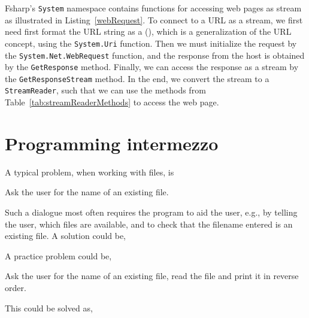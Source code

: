 Fsharp's \lstinline!System! namespace contains functions for accessing web pages as stream as illustrated in Listing~\ref{webRequest}.
%
%
To connect to a URL as a stream, we first need first format the URL string as a  (), which is a generalization of the URL concept, using the \lstinline!System.Uri! function. Then we must initialize the request by the \lstinline!System.Net.WebRequest! function, and the response from the host is obtained by the \lstinline!GetResponse! method. Finally, we can access the response as a stream by the \lstinline!GetResponseStream! method. In the end, we convert the stream to a \lstinline!StreamReader!, such that we can use the methods from Table~\ref{tab:streamReaderMethods} to access the web page.

\section{Programming intermezzo}
A typical problem, when working with files, is
\begin{problem}
  Ask the user for the name of an existing file.
\end{problem}
Such a dialogue most often requires the program to aid the user, e.g., by telling the user, which files are available, and to check that the filename entered is an existing file. A solution could be,
%
%

A practice problem could be,
\begin{problem}
  Ask the user for the name of an existing file, read the file and print it in reverse order.
\end{problem}
This could be solved as,
%
%

